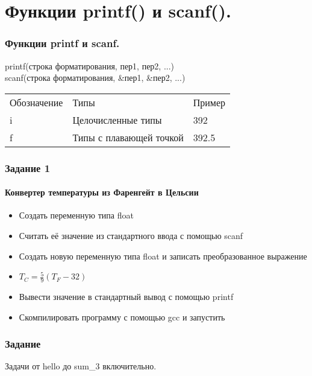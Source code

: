 \documentclass[12pt,pdf,hyperref={unicode}]{beamer}
\begin{document}
\fi

\section{Функции printf() и scanf().}

\begin{frame}
\frametitle{Функции printf и scanf.}
printf(строка форматирования, пер1, пер2, ...) \\
scanf(строка форматирования, \&пер1, \&пер2, ...)
\begin{center}
\begin{tabular}{ l l l }
  Обозначение & Типы & Пример \\
  i & Целочисленные типы & 392 \\
  f & Типы с плавающей точкой & 392.5 \\
\end{tabular}
\end{center}
\end{frame}



\iffalse

\begin{frame}
\frametitle{Задание 1} 
\framesubtitle{Конвертер температуры из Фаренгейт в Цельсии} 
\begin{center}
\begin{itemize}
\item Создать переменную типа float \\
\item Считать её значение из стандартного ввода с помощью scanf\\
\item Создать новую переменную типа float и записать преобразованное выражение \\
\item $T_C = \frac{5}{9}(T_F-32)$\\
\item Вывести значение в стандартный вывод с помощью printf\\
\item Скомпилировать программу с помощью gcc и запустить
\end{itemize}
\end{center}
\end{frame}


\begin{frame}
\frametitle{Задание} 
Задачи от hello до sum\_3 включительно.
\end{frame}
\end{document}

